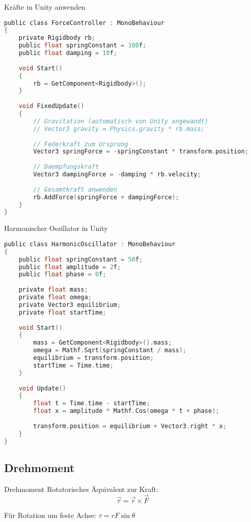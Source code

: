 \begin{code}{Kräfte in Unity anwenden}
\begin{lstlisting}[language=C, style=basesmol]
public class ForceController : MonoBehaviour 
{
    private Rigidbody rb;
    public float springConstant = 100f;
    public float damping = 10f;
    
    void Start() 
    {
        rb = GetComponent<Rigidbody>();
    }
    
    void FixedUpdate() 
    {
        // Gravitation (automatisch von Unity angewandt)
        // Vector3 gravity = Physics.gravity * rb.mass;
        
        // Federkraft zum Ursprung
        Vector3 springForce = -springConstant * transform.position;
        
        // Daempfungskraft
        Vector3 dampingForce = -damping * rb.velocity;
        
        // Gesamtkraft anwenden
        rb.AddForce(springForce + dampingForce);
    }
}
\end{lstlisting}
\end{code}

\begin{code}{Harmonischer Oszillator in Unity}
\begin{lstlisting}[language=C, style=basesmol]
public class HarmonicOscillator : MonoBehaviour 
{
    public float springConstant = 50f;
    public float amplitude = 2f;
    public float phase = 0f;
    
    private float mass;
    private float omega;
    private Vector3 equilibrium;
    private float startTime;
    
    void Start() 
    {
        mass = GetComponent<Rigidbody>().mass;
        omega = Mathf.Sqrt(springConstant / mass);
        equilibrium = transform.position;
        startTime = Time.time;
    }
    
    void Update() 
    {
        float t = Time.time - startTime;
        float x = amplitude * Mathf.Cos(omega * t + phase);
        
        transform.position = equilibrium + Vector3.right * x;
    }
}
\end{lstlisting}
\end{code}

\subsection{Drehmoment}

\begin{definition}{Drehmoment}
    Rotatorisches Äquivalent zur Kraft:
    $$\vec{\tau} = \vec{r} \times \vec{F}$$
    
    Für Rotation um feste Achse: $\tau = rF\sin\theta$
\end{definition}

